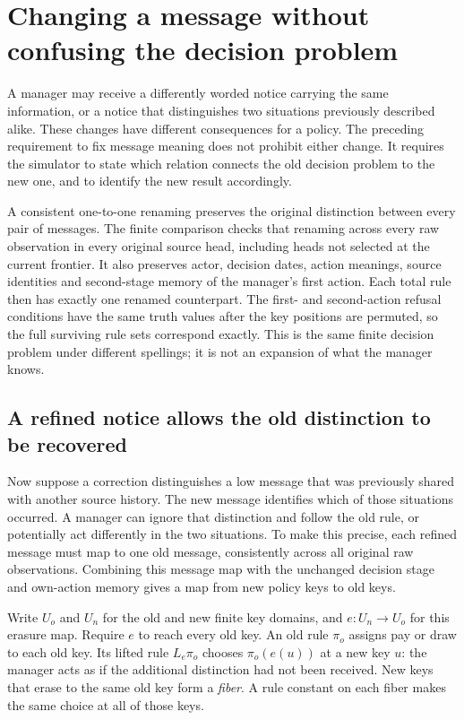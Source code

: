 \section{Changing a message without confusing the decision problem}
\label{sim:policy-message-refinement}

A manager may receive a differently worded notice carrying the same information, or a notice that distinguishes two situations previously described alike. These changes have different consequences for a policy. The preceding requirement to fix message meaning does not prohibit either change. It requires the simulator to state which relation connects the old decision problem to the new one, and to identify the new result accordingly.

A consistent one-to-one renaming preserves the original distinction between every pair of messages. The finite comparison checks that renaming across every raw observation in every original source head, including heads not selected at the current frontier. It also preserves actor, decision dates, action meanings, source identities and second-stage memory of the manager's first action. Each total rule then has exactly one renamed counterpart. The first- and second-action refusal conditions have the same truth values after the key positions are permuted, so the full surviving rule sets correspond exactly. This is the same finite decision problem under different spellings; it is not an expansion of what the manager knows.

\subsection{A refined notice allows the old distinction to be recovered}

Now suppose a correction distinguishes a low message that was previously shared with another source history. The new message identifies which of those situations occurred. A manager can ignore that distinction and follow the old rule, or potentially act differently in the two situations. To make this precise, each refined message must map to one old message, consistently across all original raw observations. Combining this message map with the unchanged decision stage and own-action memory gives a map from new policy keys to old keys.

Write $U_o$ and $U_n$ for the old and new finite key domains, and $e:U_n\to U_o$ for this erasure map. Require $e$ to reach every old key. An old rule $\pi_o$ assigns pay or draw to each old key. Its lifted rule $L_e\pi_o$ chooses $\pi_o(e(u))$ at a new key $u$: the manager acts as if the additional distinction had not been received. New keys that erase to the same old key form a \emph{fiber}. A rule constant on each fiber makes the same choice at all of those keys.

